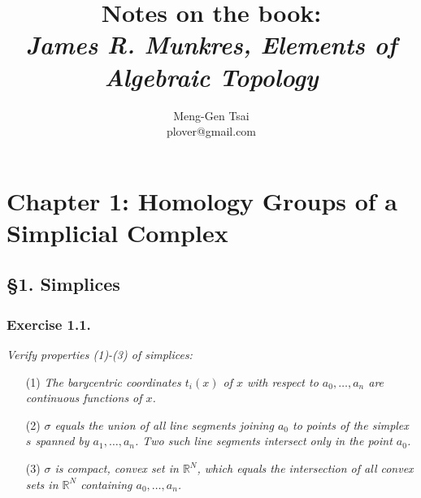 \documentclass{article}
\title{\textbf{Notes on the book: \\ \emph{James R. Munkres, Elements of Algebraic Topology}}}
\author{Meng-Gen Tsai \\ plover@gmail.com}
\begin{document}
\maketitle
\tableofcontents












\newpage
\section*{Chapter 1: Homology Groups of a Simplicial Complex \\}



\subsection*{\S 1. Simplices \\}



\subsubsection*{Exercise 1.1.}
\emph{Verify properties (1)-(3) of simplices:}
\begin{enumerate}
\item[(1)]
  \emph{The barycentric coordinates $t_i(x)$ of $x$ with respect to $a_0, \ldots, a_n$
  are continuous functions of $x$.}

\item[(2)]
  \emph{$\sigma$ equals the union of all line segments joining $a_0$ to
  points of the simplex $s$ spanned by $a_1, \ldots, a_n$.
  Two such line segments intersect only in the point $a_0$.}

\item[(3)]
  \emph{$\sigma$ is compact, convex set in $\mathbb{R}^N$,
  which equals the intersection of all convex sets in $\mathbb{R}^N$ containing $a_0, \ldots, a_n$.} \\
\end{enumerate}
\end{document}
